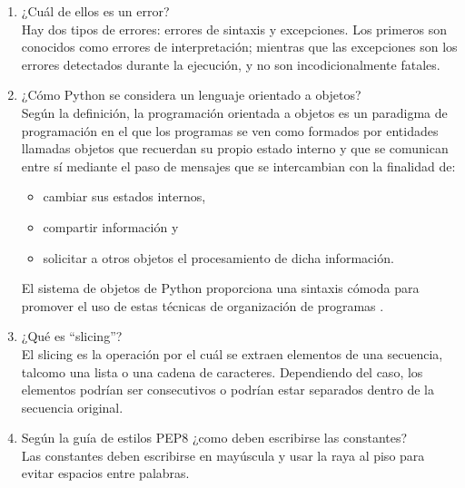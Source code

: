 \documentclass[a4paper,openright,12pt]{report}
\begin{document}
\begin{itemize}
\begin{enumerate}
			
			\item ¿Cuál de ellos es un error?\\
			
			Hay dos tipos de errores: errores de sintaxis y excepciones. Los primeros son conocidos como errores de interpretación; mientras que las excepciones son los errores detectados durante la ejecución, y no son incodicionalmente fatales.\\
			
			\item ¿Cómo Python se considera un lenguaje orientado a objetos?\\
			
			Según la definición, la programación orientada a objetos es un paradigma de programación en el que los programas se ven como formados por entidades llamadas objetos que recuerdan su propio estado interno y que se comunican entre sí mediante el paso de mensajes que se intercambian con la finalidad de:\\
			
			
				\begin{itemize} 
						\item cambiar sus estados internos,
						\item compartir información y
						\item solicitar a otros objetos el procesamiento de dicha información.
				\end{itemize} 
			
			El sistema de objetos de Python proporciona una sintaxis cómoda para promover el uso de estas técnicas de organización de programas \cite{lopez2006programacion}.\\
			
			
			\item ¿Qué es ``slicing''?\\
			
			El slicing es la operación por el cuál se extraen elementos de una secuencia, talcomo una lista o una cadena de caracteres. Dependiendo del caso, los elementos podrían ser consecutivos o podrían estar separados dentro de la secuencia original.\\
			
			\item  Según la guía de estilos PEP8 ¿como deben escribirse las constantes? \\
			
			Las constantes deben escribirse en mayúscula y usar la raya al piso para evitar espacios entre palabras.\\
			

\end{enumerate}
\end{itemize}
\end{document}
